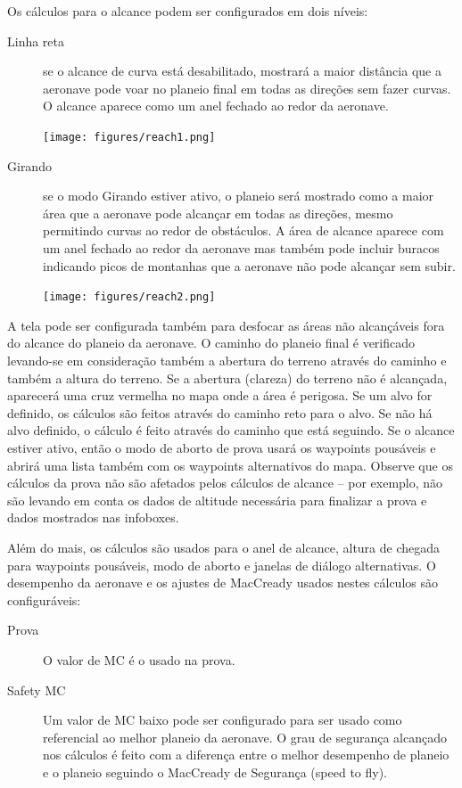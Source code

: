 Os cálculos para o alcance podem ser configurados  em dois níveis: 
\begin{description}
\item[Linha reta] se o alcance de curva está desabilitado, mostrará a maior distância 
que a aeronave pode voar no planeio final em todas as direções sem fazer curvas.  O 
alcance aparece como um anel fechado ao redor da aeronave.  

\begin{center}
\texttt{[image: figures/reach1.png]}
\end{center}

\item[Girando] se o modo Girando estiver ativo, o planeio será mostrado como a maior área 
que a aeronave pode alcançar em todas as direções, mesmo permitindo curvas ao redor de 
obstáculos.  A área de alcance aparece com um anel fechado ao redor da aeronave mas 
também pode incluir buracos indicando picos de montanhas que a aeronave não pode alcançar 
sem subir.

\begin{center}
\texttt{[image: figures/reach2.png]}
\end{center}

\end{description}

A tela pode ser configurada também para desfocar as áreas não alcançáveis fora do alcance do planeio da aeronave.  O caminho do planeio final é verificado levando-se em consideração também a abertura do terreno através do caminho e também a altura do terreno.
Se a abertura (clareza) do terreno não é alcançada, aparecerá uma cruz vermelha no mapa onde a área é perigosa.  Se um alvo for definido, os cálculos são feitos através do caminho reto para o alvo.  Se não há alvo definido, o cálculo é feito através do caminho que está seguindo.
Se o alcance estiver ativo, então o modo de aborto de prova usará os waypoints pousáveis e abrirá uma lista também com os waypoints alternativos do mapa.
Observe que os cálculos da prova não são afetados pelos cálculos de alcance – por exemplo, não são levando em conta os dados de altitude necessária para finalizar a prova e dados mostrados nas infoboxes.

Além do mais, os cálculos são usados para o anel de alcance, altura de chegada para waypoints pousáveis, modo de aborto e janelas de diálogo alternativas.  O desempenho da aeronave e os ajustes de MacCready usados nestes cálculos são configuráveis:
\begin{description}
\item[Prova] O valor de MC é o usado na prova.
\item[Safety MC] Um valor de MC baixo pode ser configurado para ser usado como referencial ao melhor planeio da aeronave.  O grau de segurança alcançado nos cálculos é feito com a diferença entre o melhor desempenho de planeio e o planeio seguindo o MacCready de Segurança (speed to fly).  
\end{description}

